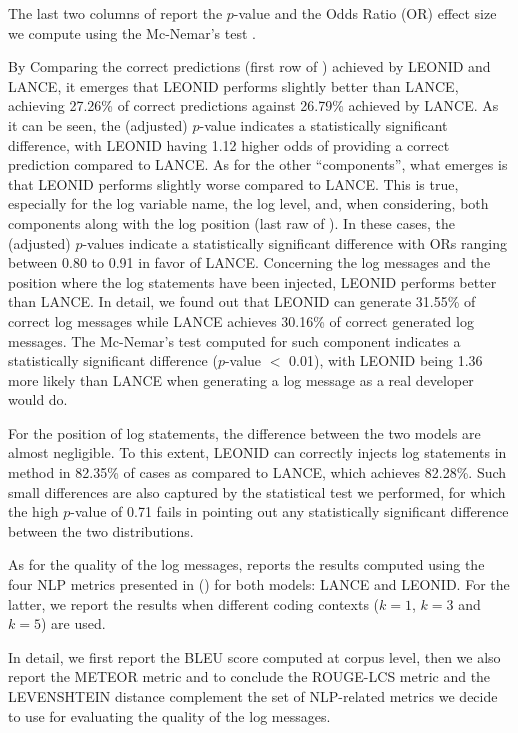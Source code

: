 The last two columns of  report the $p$-value and the Odds Ratio (OR) effect size we compute using the Mc-Nemar's test \cite{mcnemar}.

By Comparing the correct predictions (\ie first row of ) achieved by LEONID and LANCE, it emerges that LEONID performs slightly better than LANCE, achieving 27.26\% of correct predictions against 26.79\% achieved by LANCE. As it can be seen, the (adjusted) $p$-value indicates a statistically significant difference, with LEONID having 1.12 higher odds of providing a correct prediction compared to LANCE. 
As for the other ``components'', what emerges is that LEONID performs slightly worse compared to LANCE.
This is true, especially for the log variable name, the log level, and, when considering, both components along with the log position (\ie last raw of ). 
In these cases, the (adjusted) $p$-values indicate a statistically significant difference with ORs ranging between 0.80 to 0.91 in favor of LANCE. Concerning the log messages and the position where the log statements have been injected, LEONID performs better than LANCE.
In detail, we found out that LEONID can generate 31.55\% of correct log messages while LANCE achieves 30.16\% of correct generated log messages. The Mc-Nemar's test computed for such component indicates a statistically significant difference ($p$-value $<$ 0.01), with LEONID being 1.36 more likely than LANCE when generating a log message as a real developer would do.

For the position of log statements, the difference between the two models are almost negligible. To this extent, LEONID can correctly injects log statements in \java method in 82.35\% of cases as compared to LANCE, which achieves 82.28\%. Such small differences are also captured by the statistical test we performed, for which the high $p$-value of 0.71 fails in pointing out any statistically significant difference between the two distributions.

As for the quality of the log messages,  reports the results computed using the four NLP metrics presented in () for both models: LANCE and LEONID. For the latter, we report the results when different coding contexts (\ie $k=1$, $k=3$ and $k=5$) are used. 

In detail, we first report the BLEU score computed at corpus level, then we also report the METEOR metric and to conclude the ROUGE-LCS metric and the LEVENSHTEIN distance complement the set of NLP-related metrics we decide to use for evaluating the quality of the log messages.

